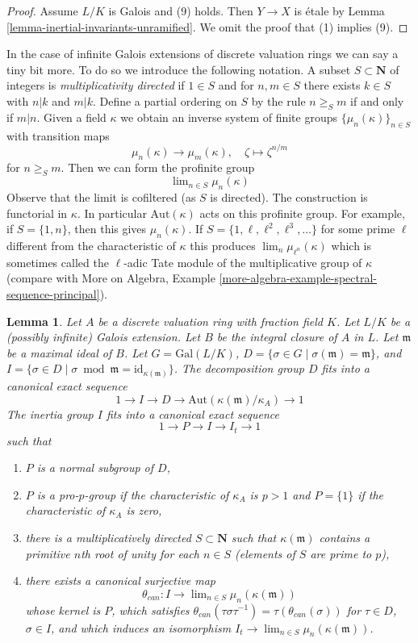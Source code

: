 \documentclass{stacks-project}
\theoremstyle{plain}
\newtheorem{lemma}[subsection]{Lemma}
\theoremstyle{definition}
\theoremstyle{remark}
\numberwithin{equation}{subsection}
\def\lim{\mathop{\mathrm{lim}}\nolimits}
\begin{document}
\begin{proof}
\medskip\noindent
Assume $L/K$ is Galois and (9) holds. Then $Y \to X$ is \'etale
by Lemma \ref{lemma-inertial-invariants-unramified}.
We omit the proof that (1) implies (9).
\end{proof}

\noindent
In the case of infinite Galois extensions of discrete valuation rings
we can say a tiny bit more. To do so we introduce the following notation.
A subset $S \subset \mathbf{N}$ of integers is {\it multiplicativity directed}
if $1 \in S$ and for $n, m \in S$ there exists $k \in S$ with
$n | k$ and $m | k$. Define a partial ordering on $S$ by the rule
$n \geq_S m$ if and only if $m | n$. Given a field $\kappa$ we obtain
an inverse system of finite groups $\{\mu_n(\kappa)\}_{n \in S}$
with transition maps
$$
\mu_n(\kappa) \longrightarrow \mu_m(\kappa),\quad
\zeta \longmapsto \zeta^{n/m}
$$
for $n \geq_S m$. Then we can form the profinite group
$$
\lim_{n \in S} \mu_n(\kappa)
$$
Observe that the limit is cofiltered (as $S$ is directed).
The construction is functorial in $\kappa$. In particular
$\text{Aut}(\kappa)$ acts on this profinite group.
For example, if $S = \{1, n\}$, then this gives $\mu_n(\kappa)$.
If $S = \{1, \ell, \ell^2, \ell^3, \ldots\}$ for some prime
$\ell$ different from the characteristic of $\kappa$ this produces
$\lim_n \mu_{\ell^n}(\kappa)$
which is sometimes called the $\ell$-adic Tate module of the multiplicative
group of $\kappa$ (compare with
More on Algebra, Example
\ref{more-algebra-example-spectral-sequence-principal}).

\begin{lemma}
\label{lemma-structure-decomposition}
Let $A$ be a discrete valuation ring with fraction field $K$.
Let $L/K$ be a (possibly infinite) Galois extension.
Let $B$ be the integral closure of $A$ in $L$.
Let $\mathfrak m$ be a maximal ideal of $B$.
Let $G = \text{Gal}(L/K)$,
$D = \{\sigma \in G \mid \sigma(\mathfrak m) = \mathfrak m\}$, and
$I = \{\sigma \in D \mid \sigma \bmod \mathfrak m =
\text{id}_{\kappa(\mathfrak m)}\}$.
The decomposition group $D$ fits into a canonical exact sequence
$$
1 \to I \to D \to \text{Aut}(\kappa(\mathfrak m)/\kappa_A) \to 1
$$
The inertia group $I$ fits into a canonical exact sequence
$$
1 \to P \to I \to I_t \to 1
$$
such that
\begin{enumerate}
\item $P$ is a normal subgroup of $D$,
\item $P$ is a pro-$p$-group if the characteristic of
$\kappa_A$ is $p > 1$ and $P = \{1\}$ if the characteristic of $\kappa_A$
is zero,
\item there is a multiplicatively directed $S \subset \mathbf{N}$
such that $\kappa(\mathfrak m)$ contains a primitive $n$th root of unity
for each $n \in S$ (elements of $S$ are prime to $p$),
\item there exists a canonical surjective map
$$
\theta_{can} : I \to \lim_{n \in S} \mu_n(\kappa(\mathfrak m))
$$
whose kernel is $P$, which satisfies
$\theta_{can}(\tau \sigma \tau^{-1}) = \tau(\theta_{can}(\sigma))$
for $\tau \in D$, $\sigma \in I$, and which induces an isomorphism
$I_t \to \lim_{n \in S} \mu_n(\kappa(\mathfrak m))$.
\end{enumerate}
\end{lemma}
\end{document}
